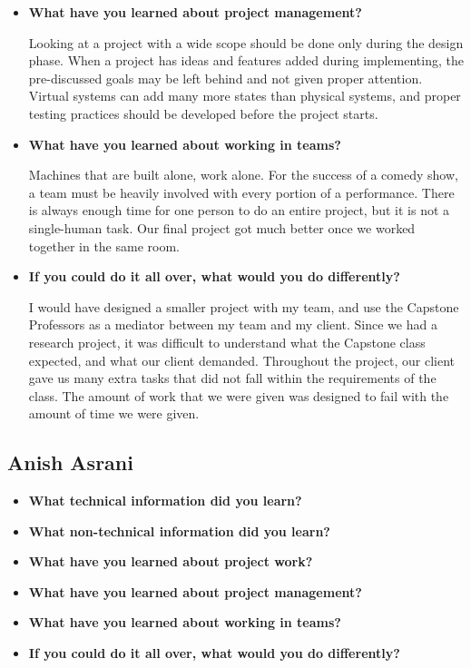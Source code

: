 \documentclass[onecolumn, draftclsnofoot,10pt, compsoc]{IEEEtran}
\begin{document}
\begin{itemize}
    
        
\item{\textbf{What have you learned about project management?}}

    Looking at a project with a wide scope should be done only during the design phase.
    When a project has ideas and features added during implementing, the pre-discussed goals may be left behind and not given proper attention.
    Virtual systems can add many more states than physical systems, and proper testing practices should be developed before the project starts.


\item{\textbf{What have you learned about working in teams?}}

        Machines that are built alone, work alone. 
        For the success of a comedy show, a team must be heavily involved with every portion of a performance.
        There is always enough time for one person to do an entire project, but it is not a single-human task.     
        Our final project got much better once we worked together in the same room.   


\item{\textbf{If you could do it all over, what would you do differently?}}

    I would have designed a smaller project with my team, and use the Capstone Professors as a mediator between my team and my client.
    Since we had a research project, it was difficult to understand what the Capstone class expected, and what our client demanded.
    Throughout the project, our client gave us many extra tasks that did not fall within the requirements of the class.
    The amount of work that we were given was designed to fail with the amount of time we were given.
  
\end{itemize}  
    
    
    

    


\pagebreak

\subsection{Anish Asrani}

\begin{itemize}
\item{\textbf{What technical information did you learn?}}

\item{\textbf{What non-technical information did you learn?}}

\item{\textbf{What have you learned about project work?}}

\item{\textbf{What have you learned about project management?}}


\item{\textbf{What have you learned about working in teams?}}


\item{\textbf{If you could do it all over, what would you do differently?}}
\end{itemize}
\end{document}
